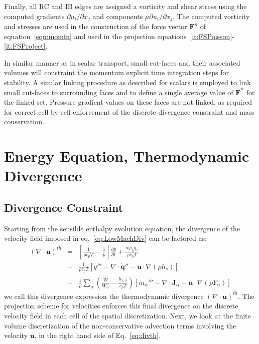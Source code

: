 Finally, all RC and IB edges are assigned a vorticity and shear stress using the computed gradients $\partial u_i/\partial x_j$ and components $\mu \partial u_i/\partial x_j$. The computed vorticity and stresses are used in the construction of the force vector $\mathbf{F}^n$ of equation~\eqref{eqn:momfn} and used in the projection equations~\eqref{it:FSPoisson}-\eqref{it:FSProject}.


In similar manner as in scalar transport, small cut-faces and their associated volumes will constraint the momentum explicit time integration steps for stability. A similar linking procedure as described for scalars is employed to link small cut-faces to surrounding faces and to define a single average value of $\overline{\mathbf{F}}^n$ for the linked set. Pressure gradient values on these faces are not linked, as required for correct cell by cell enforcement of the discrete divergence constraint and mass conservation.

\section{Energy Equation, Thermodynamic Divergence}

\subsection{Divergence Constraint}

Starting from the sensible enthalpy evolution equation, the divergence of the velocity field  imposed in eq.~\eqref{eq:LowMachDiv} can be factored as:
%
\begin{eqnarray}
    ( \nabla \cdot \mathbf{u} )^{th} &=&
    \left[ \frac{1}{\rho c_p T} - \frac{1}{\bar{p}} \right]
    \frac{\partial \bar{p}}{\partial t} + \frac{w \rho_0 g_z}{\rho c_p T} \nonumber \\
    &+& \frac{1}{\rho c_p T} \left[ \dot{q}''' - \nabla \cdot \dot{\mathbf{q}}'' - \mathbf{u} \cdot \nabla (\rho h_s) \right] \nonumber \\
    &+& \frac{1}{\rho} \sum_\alpha \left( \frac{\overline{W}}{W_\alpha} - \frac{h_{s,\alpha}}{c_p T} \right) \left[ \dot{m}_\alpha''' - \nabla \cdot \mathbf{J}_\alpha - \mathbf{u} \cdot \nabla (\rho Y_\alpha) \right] \label{eq:divth}
\end{eqnarray}
%
we call this divergence expression the thermodynamic divergence $( \nabla \cdot \mathbf{u} )^{th}$. The projection scheme for velocities enforces this final divergence on the discrete velocity field in each cell of the spatial discretization.
Next, we look at the finite volume discretization of the non-conservative advection terms involving the velocity $\mathbf{u}$, in the right hand side of Eq.~\eqref{eq:divth}.

